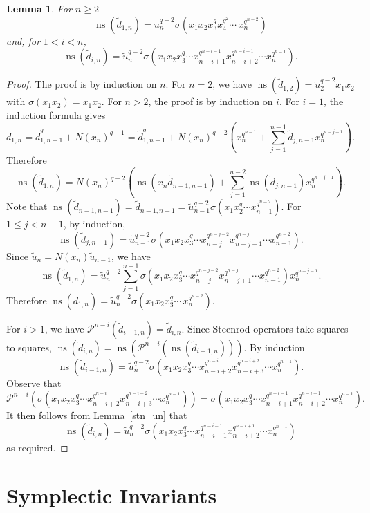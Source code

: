 \documentclass{amsart}
\newtheorem{lemma}[subsection]{Lemma}
\newcommand{\PP}{\mathcal{P}}
\DeclareMathOperator{\ns}{ns}
\begin{document}
\begin{lemma}\label{ns_di_lem} For $n\geq 2$ 
$$\ns(\widetilde{d}_{1,n})=\widetilde{u}_n^{q-2}\sigma(x_1x_2x_3^q x_4^{q^2} \cdots \, x_n^{q^{n-2}})$$
and, for $1<i<n$, 
$$\ns(\widetilde{d}_{i,n})=\widetilde{u}_n^{q-2}\sigma(x_1x_2x_3^q\cdots x_{n-i+1}^{q^{n-i-1}}x_{n-i+2}^{q^{n-i+1}}\cdots x_n^{q^{n-1}}).$$
\end{lemma}
\begin{proof} The proof is by induction on $n$. For $n=2$, we have $\ns(\widetilde{d}_{1,2})=\widetilde{u}_2^{q-2}x_1x_2$ with $\sigma(x_1x_2)=x_1x_2$.
For $n>2$, the proof is by induction on $i$. For $i=1$, the induction formula gives
$$\widetilde{d}_{1,n}=\widetilde{d}_{1,n-1}^q+N(x_n)^{q-1}=\widetilde{d}_{1,n-1}^q+N(x_n)^{q-2}(x_n^{q^{n-1}}+\sum_{j=1}^{n-1}\widetilde{d}_{j,n-1} x_n^{q^{n-j-1}}).$$
Therefore
$$\ns(\widetilde{d}_{1,n})=N(x_n)^{q-2}(\ns(x_n\widetilde{d}_{n-1,n-1})+\sum_{j=1}^{n-2}\ns(\widetilde{d}_{j,n-1}) x_n^{q^{n-j-1}}).$$
Note that $\ns(\widetilde{d}_{n-1,n-1})=\widetilde{d}_{n-1,n-1}=\widetilde{u}_{n-1}^{q-2}\sigma(x_1x_2^q\cdots x_{n-1}^{q^{n-2}})$.
For $1\leq j<n-1$, by induction, 
$$\ns(\widetilde{d}_{j,n-1})=\widetilde{u}_{n-1}^{q-2}\sigma(x_1x_2x_3^q\cdots x_{n-j}^{q^{n-j-2}}x_{n-j+1}^{q^{n-j}}\cdots x_{n-1}^{q^{n-2}}).$$
Since $\widetilde{u}_n=N(x_n)\widetilde{u}_{n-1}$, we have
$$\ns(\widetilde{d}_{1,n})=\widetilde{u}_n^{q-2}\sum_{j=1}^{n-1}\sigma(x_1x_2x_3^q \cdots x_{n-j}^{q^{n-j-2}}x_{n-j+1}^{q^{n-j}}\cdots x_{n-1}^{q^{n-2}})x_n^{q^{n-j-1}}.$$
Therefore $\ns(\widetilde{d}_{1,n})=\widetilde{u}_n^{q-2}\sigma(x_1x_2x_3^q \cdots \, x_n^{q^{n-2}})$.

For $i>1$, we have $\PP^{n-i}(\widetilde{d}_{i-1,n})= \widetilde{d}_{i,n}$. 
Since Steenrod operators take squares to squares, $\ns(\widetilde{d}_{i,n})=\ns(\PP^{n-i}(\ns(\widetilde{d}_{i-1,n})))$.
By induction 
$$\ns(\widetilde{d}_{i-1,n})=\widetilde{u}_n^{q-2}\sigma(x_1x_2x_3^q\cdots x_{n-i+2}^{q^{n-i}}x_{n-i+3}^{q^{n-i+2}}\cdots x_n^{q^{n-1}}).$$
Observe that 
 $$\PP^{n-i}(\sigma(x_1x_2x_3^q\cdots x_{n-i+2}^{q^{n-i}}x_{n-i+3}^{q^{n-i+2}}\cdots x_n^{q^{n-1}}))
 =\sigma(x_1x_2x_3^q\cdots x_{n-i+1}^{q^{n-i-1}}x_{n-i+2}^{q^{n-i+1}}\cdots x_n^{q^{n-1}}).$$
It then follows from Lemma~\ref{stn_un} that
$$\ns(\widetilde{d}_{i,n})=\widetilde{u}_n^{q-2}\sigma(x_1x_2x_3^q\cdots x_{n-i+1}^{q^{n-i-1}}x_{n-i+2}^{q^{n-i+1}}\cdots x_n^{q^{n-1}})$$
as required.
\end{proof}

\section{Symplectic Invariants}\label{sec: symplectics}
\end{document}
